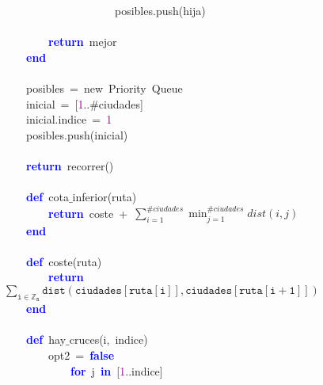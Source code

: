 \mbox{}\ \ \ \ \ \ \ \ \ \ \ \ \ \ \ \ \ \ \ \ posibles\textcolor{BrickRed}{.}push\textcolor{BrickRed}{(}hija\textcolor{BrickRed}{)} \\
\mbox{} \\
\mbox{}\ \ \ \ \ \ \ \ \textbf{\textcolor{Blue}{return}}\ mejor \\
\mbox{}\ \ \ \ \textbf{\textcolor{Blue}{end}} \\
\mbox{} \\
\mbox{}\ \ \ \ posibles\ \textcolor{BrickRed}{=}\ new\ Priority\ Queue \\
\mbox{}\ \ \ \ inicial\ \textcolor{BrickRed}{=}\ \textcolor{BrickRed}{[}\textcolor{Purple}{1}\textcolor{BrickRed}{..}\#ciudades\textcolor{BrickRed}{]} \\
\mbox{}\ \ \ \ inicial\textcolor{BrickRed}{.}indice\ \textcolor{BrickRed}{=}\ \textcolor{Purple}{1} \\
\mbox{}\ \ \ \ posibles\textcolor{BrickRed}{.}push\textcolor{BrickRed}{(}inicial\textcolor{BrickRed}{)} \\
\mbox{}\ \ \ \  \\
\mbox{}\ \ \ \ \textbf{\textcolor{Blue}{return}}\ recorrer\textcolor{BrickRed}{()} \\
\mbox{} \\
\mbox{}\ \ \ \ \textbf{\textcolor{Blue}{def}}\ cota$\_$inferior\textcolor{BrickRed}{(}ruta\textcolor{BrickRed}{)} \\
\mbox{}\ \ \ \ \ \ \ \ \textbf{\textcolor{Blue}{return}}\ coste\ \textcolor{BrickRed}{+}\ $\sum_{i=1}^{\#ciudades} \min_{j=1}^{\#ciudades} dist(i,j)$ \\
\mbox{}\ \ \ \ \textbf{\textcolor{Blue}{end}} \\
\mbox{} \\
\mbox{}\ \ \ \ \textbf{\textcolor{Blue}{def}}\ coste\textcolor{BrickRed}{(}ruta\textcolor{BrickRed}{)} \\
\mbox{}\ \ \ \ \ \ \ \ \textbf{\textcolor{Blue}{return}}\ $\mathtt{\sum_{i \in \mathbb{Z}_n} dist(ciudades[ruta[i]], ciudades[ruta[i+1]])}$ \\
\mbox{}\ \ \ \ \textbf{\textcolor{Blue}{end}} \\
\mbox{} \\
\mbox{}\ \ \ \ \textbf{\textcolor{Blue}{def}}\ hay$\_$cruces\textcolor{BrickRed}{(}i\textcolor{BrickRed}{,}\ indice\textcolor{BrickRed}{)} \\
\mbox{}\ \ \ \ \ \ \ \ opt2\ \textcolor{BrickRed}{=}\ \textbf{\textcolor{Blue}{false}} \\
\mbox{}\ \ \ \ \ \ \ \ \ \ \ \ \textbf{\textcolor{Blue}{for}}\ j\ \textbf{\textcolor{Blue}{in}}\ \textcolor{BrickRed}{[}\textcolor{Purple}{1}\textcolor{BrickRed}{..}indice\textcolor{BrickRed}{]} \\
